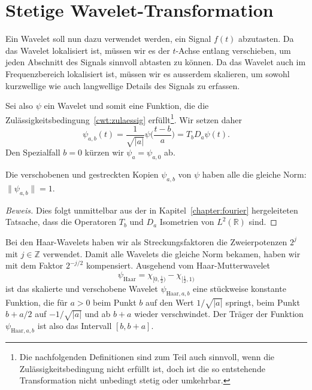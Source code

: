 %
%
%
\section{Stetige Wavelet-Transformation
\label{sextion:cwt}}
Ein Wavelet soll nun dazu verwendet werden, ein Signal $f(t)$ abzutasten.
Da das Wavelet lokalisiert ist, müssen wir es der $t$-Achse entlang
verschieben, um jeden Abschnitt des Signals sinnvoll abtasten zu
können.
Da das Wavelet auch im Frequenzbereich lokalisiert ist, müssen wir
es ausserdem skalieren, um sowohl kurzwellige wie auch langwellige
Details des Signals zu erfassen.

Sei also $\psi$ ein Wavelet und somit eine Funktion, die die
Zulässigkeitsbedingung~\eqref{cwt:zulaessig} erfüllt\footnote{Die nachfolgenden
Definitionen sind zum Teil auch sinnvoll, wenn die Zulässigkeitsbedingung
nicht erfüllt ist, doch ist die so entstehende Transformation nicht unbedingt
stetig oder umkehrbar.}.
Wir setzen daher
\[
\psi_{a,b}(t)
=
\frac{1}{\sqrt{|a|}} \psi\biggl(\frac{t-b}a\biggr)
=
T_bD_a\psi (t).
\]
Den Spezialfall $b=0$ kürzen wir $\psi_a = \psi_{a,0}$ ab.

\begin{lemma}
Die verschobenen und gestreckten Kopien $\psi_{a,b}$ von $\psi$ haben alle
die gleiche Norm: $\|\psi_{a,b}\|=1$.
\end{lemma}

\begin{proof}[Beweis]
Dies folgt unmittelbar aus der in Kapitel~\ref{chapter:fourier}
hergeleiteten Tatsache, dass die Operatoren $T_b$ und $D_a$
Isometrien von $L^2(\mathbb R)$ sind.
\end{proof}

\begin{beispiel}
Bei den Haar-Wavelets haben wir als Streckungsfaktoren die Zweierpotenzen
$2^j$ mit $j\in\mathbb Z$ verwendet.
Damit alle Wavelets die gleiche Norm bekamen, haben wir mit dem Faktor
$2^{-j/2}$ kompensiert.
Ausgehend vom Haar-Mutterwavelet
\[
\psi_{\text{Haar}} = \chi_{[0,\frac12)} - \chi_{[\frac12,1)}
\]
ist das skalierte und verschobene Wavelet
$\psi_{\text{Haar},a,b}$ eine stückweise konstante Funktion,
die für $a>0$ beim Punkt $b$ auf den Wert $1/\sqrt{|a|}$ springt,
beim Punkt $b+a/2$ auf $-1/\sqrt{|a|}$ und ab $b+a$ wieder verschwindet.
Der Träger der Funktion $\psi_{\text{Haar},a,b}$ ist also das Intervall
$[b,b+a]$.
\end{beispiel}

